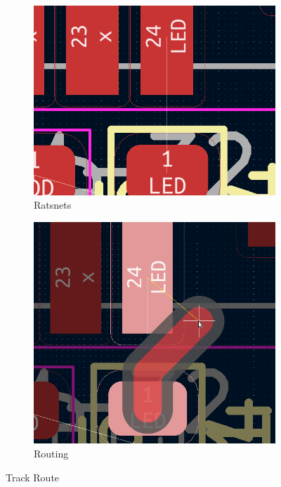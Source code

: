 \documentclass[12pt]{book}
\begin{document}
	\begin{figure}[!ht]
		\centering
		\begin{subfigure}[t]{0.45\textwidth}
			\includegraphics[width=\textwidth]{images/pcb/pcb_12}
			\caption{Ratsnets}
		\end{subfigure}
		\begin{subfigure}[t]{0.45\textwidth}
			\includegraphics[width=\textwidth]{images/pcb/pcb_13}
			\caption{Routing}
		\end{subfigure}
		\caption{Track Route}
	\end{figure}
\end{document}
